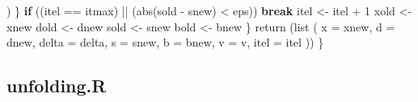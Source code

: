 \documentclass[
  12pt,
]{book}
\newenvironment{Shaded}{\begin{snugshade}}{\end{snugshade}}
\newcommand{\AttributeTok}[1]{\textcolor[rgb]{0.77,0.63,0.00}{#1}}
\newcommand{\ControlFlowTok}[1]{\textcolor[rgb]{0.13,0.29,0.53}{\textbf{#1}}}
\newcommand{\DecValTok}[1]{\textcolor[rgb]{0.00,0.00,0.81}{#1}}
\newcommand{\FunctionTok}[1]{\textcolor[rgb]{0.00,0.00,0.00}{#1}}
\newcommand{\NormalTok}[1]{#1}
\newcommand{\OtherTok}[1]{\textcolor[rgb]{0.56,0.35,0.01}{#1}}
\newcommand{\SpecialCharTok}[1]{\textcolor[rgb]{0.00,0.00,0.00}{#1}}
\theoremstyle{definition}
\theoremstyle{definition}
\theoremstyle{definition}
\theoremstyle{definition}
\theoremstyle{remark}
\begin{document}
\begin{Shaded}
\begin{Highlighting}[]
\NormalTok{        )}
\NormalTok{      \}}
      \ControlFlowTok{if}\NormalTok{ ((itel }\SpecialCharTok{==}\NormalTok{ itmax) }\SpecialCharTok{||}\NormalTok{ (}\FunctionTok{abs}\NormalTok{(sold }\SpecialCharTok{{-}}\NormalTok{ snew) }\SpecialCharTok{\textless{}}\NormalTok{ eps))}
        \ControlFlowTok{break}
\NormalTok{      itel }\OtherTok{\textless{}{-}}\NormalTok{ itel }\SpecialCharTok{+} \DecValTok{1}
\NormalTok{      xold }\OtherTok{\textless{}{-}}\NormalTok{ xnew}
\NormalTok{      dold }\OtherTok{\textless{}{-}}\NormalTok{ dnew}
\NormalTok{      sold }\OtherTok{\textless{}{-}}\NormalTok{ snew}
\NormalTok{      bold }\OtherTok{\textless{}{-}}\NormalTok{ bnew}
\NormalTok{    \}}
    \FunctionTok{return}\NormalTok{ (}\FunctionTok{list}\NormalTok{ (}
      \AttributeTok{x =}\NormalTok{ xnew,}
      \AttributeTok{d =}\NormalTok{ dnew,}
      \AttributeTok{delta =}\NormalTok{ delta,}
      \AttributeTok{s =}\NormalTok{ snew,}
      \AttributeTok{b =}\NormalTok{ bnew,}
      \AttributeTok{v =}\NormalTok{ v,}
      \AttributeTok{itel =}\NormalTok{ itel}
\NormalTok{    ))}
\NormalTok{  \}}
\end{Highlighting}
\end{Shaded}

\hypertarget{apcodeunfold}{%
\subsection{unfolding.R}\label{apcodeunfold}}
\end{document}
